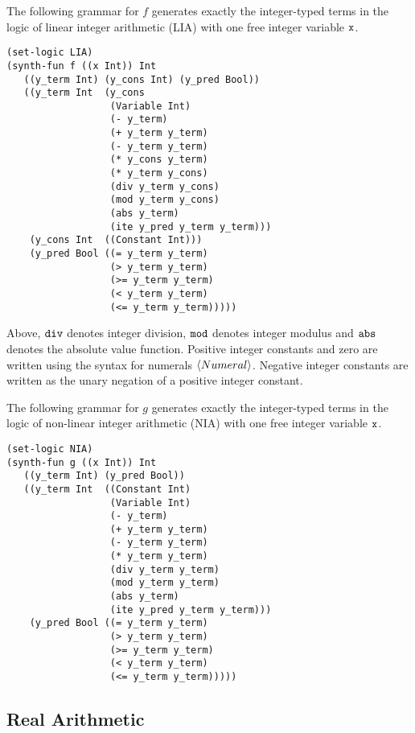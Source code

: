 \documentclass[english,a4paper,10pt]{article}
\begin{document}
\begin{appendix}
The following grammar for $f$
generates exactly the integer-typed terms in the logic of
linear integer arithmetic (LIA) with one free integer variable ${\tt x}$.
\begin{lstlisting}[basicstyle={\ttfamily}]
(set-logic LIA)
(synth-fun f ((x Int)) Int
   ((y_term Int) (y_cons Int) (y_pred Bool))
   ((y_term Int  (y_cons
                  (Variable Int)
                  (- y_term)
                  (+ y_term y_term)
                  (- y_term y_term)
                  (* y_cons y_term)
                  (* y_term y_cons)
                  (div y_term y_cons)
                  (mod y_term y_cons)
                  (abs y_term)
                  (ite y_pred y_term y_term)))
    (y_cons Int  ((Constant Int)))
    (y_pred Bool ((= y_term y_term)
                  (> y_term y_term)
                  (>= y_term y_term)
                  (< y_term y_term)
                  (<= y_term y_term)))))
\end{lstlisting}
Above, ${\tt div}$
denotes integer division,
${\tt mod}$ denotes integer modulus and ${\tt abs}$ denotes
the absolute value function.
Positive integer constants and zero are written using the syntax
for numerals $\left\langle Numeral\right\rangle$. Negative integer constants
are written as the unary negation of a positive integer constant.

The following grammar for $g$ generates exactly the integer-typed terms in the logic of
non-linear integer arithmetic (NIA)
with one free integer variable ${\tt x}$.
\begin{lstlisting}[basicstyle={\ttfamily}]
(set-logic NIA)
(synth-fun g ((x Int)) Int
   ((y_term Int) (y_pred Bool))
   ((y_term Int  ((Constant Int) 
                  (Variable Int)
                  (- y_term)
                  (+ y_term y_term)
                  (- y_term y_term)
                  (* y_term y_term)
                  (div y_term y_term)
                  (mod y_term y_term)
                  (abs y_term)
                  (ite y_pred y_term y_term)))
    (y_pred Bool ((= y_term y_term)
                  (> y_term y_term)
                  (>= y_term y_term)
                  (< y_term y_term)
                  (<= y_term y_term)))))
\end{lstlisting}

\subsection{Real Arithmetic}


\end{appendix}
\end{document}
